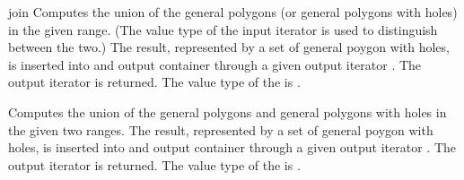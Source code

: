 \begin{ccRefFunction}{join}
{Computes the union of the general polygons (or general polygons with
holes) in the given range. (The value type of the input iterator is
used to distinguish between the two.) The result, represented by a set
of general poygon with holes, is inserted into and output container
through a given output iterator . The output iterator is
returned. The value type of the  is
.}

{Computes the union of the general polygons and general polygons
with holes in the given two ranges. The result, represented by a set
of general poygon with holes, is inserted into and output container
through a given output iterator . The output iterator is
returned. The value type of the  is
.}

\ccSeeAlso
{}\\
\\
\\

\end{ccRefFunction}
